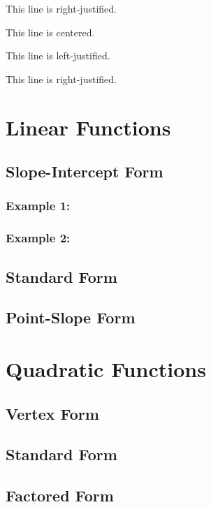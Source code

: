 \documentclass[11pt]{article}
\begin{document}
\begin{flushright}This line is right-justified.\end{flushright}

\tiny
This line is centered.

This line is left-justified.

This line is right-justified.

\section{Linear Functions}
    \subsection{Slope-Intercept Form}
        \subsubsection{Example 1:}
        \subsubsection{Example 2:}
    \subsection{Standard Form}
    \subsection{Point-Slope Form}
\section{Quadratic Functions}
    \subsection{Vertex Form}
    \subsection{Standard Form}
    \subsection{Factored Form}
\end{document}
